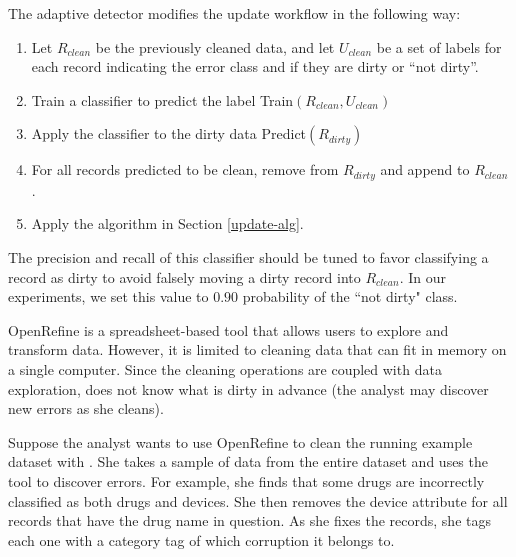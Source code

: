 The adaptive detector modifies the update workflow in the following way:
\begin{enumerate}
\item Let $R_{clean}$ be the previously cleaned data, and let $U_{clean}$ be a set of labels for each record indicating the error class and if they are dirty or ``not dirty''.
\item Train a classifier to predict the label \textsf{Train}$(R_{clean}, U_{clean})$
\item Apply the classifier to the dirty data \textsf{Predict}$(R_{dirty})$
\item For all records predicted to be clean, remove from $R_{dirty}$ and append to $R_{clean}$.
\item Apply the algorithm in Section \ref{update-alg}.
\end{enumerate}

The precision and recall of this classifier should be tuned to favor classifying a record as dirty to avoid falsely moving a dirty record into $R_{clean}$. In our experiments, we set this value to $0.90$ probability of the ``not dirty" class.

\vspace{0.75em}

\begin{example}\label{detex2}
OpenRefine is a spreadsheet-based tool that allows users to explore and transform data.
However, it is limited to cleaning data that can fit in memory on a single computer.
Since the cleaning operations are coupled with data exploration, \sys does not know what is dirty in advance (the analyst may discover new errors as she cleans).

Suppose the analyst wants to use OpenRefine to clean the running example dataset with \sys.
She takes a sample of data from the entire dataset and uses the tool to discover errors.
For example, she finds that some drugs are incorrectly classified as both drugs and devices.
She then removes the device attribute for all records that have the drug name in question.
As she fixes the records, she tags each one with a category tag of which corruption it belongs to.
\end{example}





